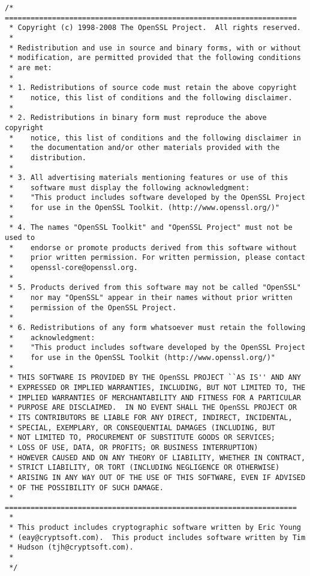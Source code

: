 \begin{enumerate}
\begin{verbatim}
/* ====================================================================
 * Copyright (c) 1998-2008 The OpenSSL Project.  All rights reserved.
 *
 * Redistribution and use in source and binary forms, with or without
 * modification, are permitted provided that the following conditions
 * are met:
 *
 * 1. Redistributions of source code must retain the above copyright
 *    notice, this list of conditions and the following disclaimer.
 *
 * 2. Redistributions in binary form must reproduce the above copyright
 *    notice, this list of conditions and the following disclaimer in
 *    the documentation and/or other materials provided with the
 *    distribution.
 *
 * 3. All advertising materials mentioning features or use of this
 *    software must display the following acknowledgment:
 *    "This product includes software developed by the OpenSSL Project
 *    for use in the OpenSSL Toolkit. (http://www.openssl.org/)"
 *
 * 4. The names "OpenSSL Toolkit" and "OpenSSL Project" must not be used to
 *    endorse or promote products derived from this software without
 *    prior written permission. For written permission, please contact
 *    openssl-core@openssl.org.
 *
 * 5. Products derived from this software may not be called "OpenSSL"
 *    nor may "OpenSSL" appear in their names without prior written
 *    permission of the OpenSSL Project.
 *
 * 6. Redistributions of any form whatsoever must retain the following
 *    acknowledgment:
 *    "This product includes software developed by the OpenSSL Project
 *    for use in the OpenSSL Toolkit (http://www.openssl.org/)"
 *
 * THIS SOFTWARE IS PROVIDED BY THE OpenSSL PROJECT ``AS IS'' AND ANY
 * EXPRESSED OR IMPLIED WARRANTIES, INCLUDING, BUT NOT LIMITED TO, THE
 * IMPLIED WARRANTIES OF MERCHANTABILITY AND FITNESS FOR A PARTICULAR
 * PURPOSE ARE DISCLAIMED.  IN NO EVENT SHALL THE OpenSSL PROJECT OR
 * ITS CONTRIBUTORS BE LIABLE FOR ANY DIRECT, INDIRECT, INCIDENTAL,
 * SPECIAL, EXEMPLARY, OR CONSEQUENTIAL DAMAGES (INCLUDING, BUT
 * NOT LIMITED TO, PROCUREMENT OF SUBSTITUTE GOODS OR SERVICES;
 * LOSS OF USE, DATA, OR PROFITS; OR BUSINESS INTERRUPTION)
 * HOWEVER CAUSED AND ON ANY THEORY OF LIABILITY, WHETHER IN CONTRACT,
 * STRICT LIABILITY, OR TORT (INCLUDING NEGLIGENCE OR OTHERWISE)
 * ARISING IN ANY WAY OUT OF THE USE OF THIS SOFTWARE, EVEN IF ADVISED
 * OF THE POSSIBILITY OF SUCH DAMAGE.
 * ====================================================================
 *
 * This product includes cryptographic software written by Eric Young
 * (eay@cryptsoft.com).  This product includes software written by Tim
 * Hudson (tjh@cryptsoft.com).
 *
 */
\end{verbatim}

\end{enumerate}